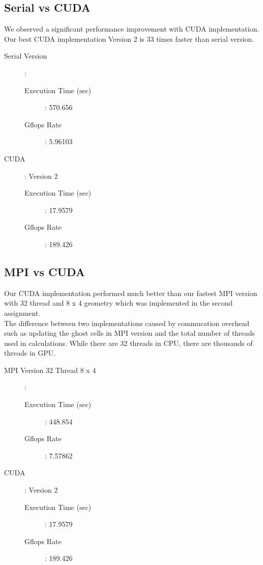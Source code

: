 \documentclass{article}
\newcommand\tab[1][0.5cm]{\hspace*{#1}}
\begin{document}
\subsection{Serial vs CUDA}
\tab We observed a significant performance improvement with CUDA implementation. Our best CUDA implementation Version 2 is 33 times faster than serial version.
  \begin{description}
    \item[Serial Version]: \hfill
      \begin{description} 
        \item[Execution Time (sec)]: 570.656\hfill 
        \item[Gflops Rate ]: 5.96103\hfill 
      \end{description}  
    \item[CUDA]: Version 2\hfill
      \begin{description} 
        \item[Execution Time (sec)]: 17.9579\hfill 
        \item[Gflops Rate ]: 189.426 \hfill 
      \end{description} 
  \end{description}    

\subsection{MPI vs CUDA}
\tab Our CUDA implementation performed much better than our fastest MPI version with 32 thread and 8 x 4 geometry which was implemented in the second assignment. 
\\ \tab The difference between two implementations caused by commucation overhead such as updating the ghost cells in MPI version and the total number of threads used in calculations. While there are 32 threads in CPU, there are thousands of threads in GPU.
  \begin{description}
    \item[MPI Version 32 Thread 8 x 4]: \hfill
      \begin{description} 
        \item[Execution Time (sec)]: 448.854 \hfill 
        \item[Gflops Rate]: 7.57862\hfill 
      \end{description}  
    \item[CUDA]: Version 2\hfill
      \begin{description} 
        \item[Execution Time (sec)]: 17.9579\hfill 
        \item[Gflops Rate ]: 189.426 \hfill 
      \end{description} 
  \end{description} 
\end{document}

